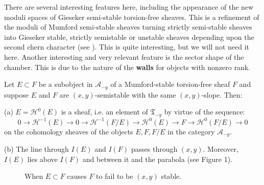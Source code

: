 \documentclass{amsart}
\begin{document}
\medskip

There are several interesting features here, including the appearance of the new moduli spaces of 
Gieseker semi-stable torsion-free sheaves. This is a refinement of the moduli of Mumford semi-stable 
sheaves turning strictly semi-stable sheaves into Gieseker stable, strictly semistable or unstable 
sheaves depending upon the 
second chern character (see \cite{BeM}). This is quite interesting, but we will not need it here.
Another  interesting and very relevant feature is the sector shape of the chamber. This is 
due to the nature of the {\bf walls} for objects with nonzero rank.

\medskip

 Let $E \subset F$ be a subobject in ${\mathcal A}_{-y}$
of a Mumford-stable torsion-free sheaf $F$ and suppose
$E$ and $F$ are $(x,y)$-semistable with the same $(x,y)$-slope. Then:


\medskip

(a) $E= {\mathcal H}^0(E)$ is a  sheaf, i.e. an element of ${\mathfrak T}_{-y}$ by virtue of the sequence: 
\[ 0 \rightarrow {\mathcal H}^{-1}(E) \rightarrow 0 \rightarrow {\mathcal H}^{-1}(F/E) \rightarrow {\mathcal H}^0(E) \rightarrow F \rightarrow {\mathcal H}^0(F/E) \rightarrow 0 \] 
on the cohomology sheaves of the objects $E,F,F/E$ in the category ${\mathcal A}_{-y}$. 

\medskip

(b) The line through $I(E)$ and $I(F)$ passes through $(x,y)$. Moreover, $I(E)$ lies 
above $I(F)$ and between it and the parabola (see Figure 1). 

\medskip

\begin{figure}
\begin{center}
\end{center}
\caption{When $E \subset F$ causes $F$ to fail to be  $(x,y)$ stable.}

\end{figure}
\end{document}
